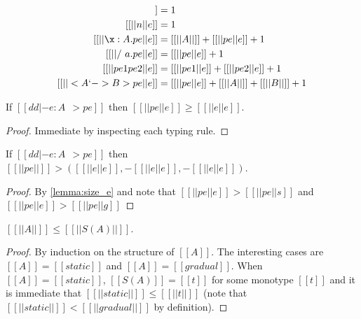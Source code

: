\begin{definition}

  \begin{align*}
    [[ || x ||e  ]] &= 1 \\
    [[ || n ||e  ]] &= 1 \\
    [[ || \x : A . pe ||e  ]] &= [[ || A || ]] + [[ || pe ||e ]] + 1 \\
    [[ || /\ a. pe ||e  ]] &= [[ || pe ||e ]] + 1 \\
    [[ || pe1 pe2 ||e  ]] &= [[ || pe1 ||e ]] + [[  || pe2 ||e ]] + 1 \\
    [[ || < A `-> B> pe ||e  ]] &= [[ || pe ||e ]] + [[  || A || ]] + [[  || B || ]] + 1 \\
  \end{align*}

\end{definition}


\begin{lemma} \label{lemma:size_e}
  If $[[dd |- e : A ~~> pe]]$ then $[[ || pe ||e    ]] \geq [[ || e ||e   ]]  $.
\end{lemma}
\begin{proof}
  Immediate by inspecting each typing rule.
\end{proof}

\begin{corollary} \label{lemma:decrease_stop}
  If $[[dd |- e : A ~~> pe]]$ then $[[ || pe ||   ]] > ([[ || e ||e ]], -[[ || e ||e ]], -[[ || e ||e ]] )  $.
\end{corollary}
\begin{proof}
  By \cref{lemma:size_e} and note that $ [[ || pe ||e   ]] > [[  || pe ||s  ]] $ and $ [[ || pe ||e   ]] > [[  || pe ||g  ]] $
\end{proof}


\begin{lemma} \label{lemma:type_decrease}
  $[[ || A || ]] \leq [[ || S(A) || ]]  $.
\end{lemma}
\begin{proof}
  By induction on the structure of $[[A]]$. The interesting cases are $[[ A ]] = [[static]]$ and
  $[[ A ]] = [[gradual]]$. When $[[ A ]] = [[static]]$, $[[ S(A) ]] = [[t]]$
  for some monotype $[[t]]$ and it is immediate that $[[ || static ||  ]]  \leq [[ || t || ]] $
  (note that $[[ || static ||  ]] < [[ || gradual ||  ]] $ by definition).
\end{proof}


